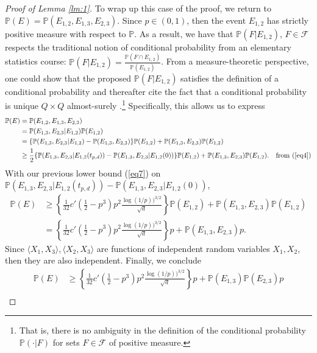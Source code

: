 \documentclass{article}
\begin{document}
\begin{proof}[Proof of Lemma \ref{lm:1}]
To wrap up this case of the proof, we return to $\mathbb{P}(E) = \mathbb{P}(E_{1,2}, E_{1,3}, E_{2,3}).$ Since $p \in (0, 1)$, then the event $E_{1,2}$ has strictly positive measure with respect to $\mathbb{P}$. As a result, we have that $\mathbb{P}( F | E_{1,2})$, $F \in \mathcal{F}$ respects the traditional notion of conditional probability from an elementary statistics course: $\mathbb{P}( F | E_{1,2}) = \frac{\mathbb{P}(F \cap E_{1,2}) }{\mathbb{P}(E_{1,2})}$. From a measure-theoretic perspective, one could show that the proposed $\mathbb{P}( F | E_{1,2})$ satisfies the definition of a conditional probability and thereafter cite the fact that a conditional probability is unique $Q \times Q$ almost-surely \cite{pollard_2001}.\footnote{That is, there is no ambiguity in the definition of the conditional probability $\mathbb{P}( \cdot | F)$ for sets $F \in \mathcal{F}$ of positive measure.} Specifically, this allows us to express
\begin{align*}
    \mathbb{P}(E) &= \mathbb{P}(E_{1,2}, E_{1,3}, E_{2,3})\\
               &= \mathbb{P}(E_{1,3}, E_{2,3} | E_{1,2}) \mathbb{P}(E_{1,2})\\
               &= \{ \mathbb{P}(E_{1,3}, E_{2,3} | E_{1,2}) - \mathbb{P}(E_{1,3}, E_{2,3}) \}\mathbb{P}(E_{1,2}) + \mathbb{P}(E_{1,3}, E_{2,3})\mathbb{P}(E_{1,2})\\
               &\geq \frac{1}{2}\{ \mathbb{P}(E_{1,3}, E_{2,3} | E_{1,2}(t_{p,d})) - \mathbb{P}(E_{1,3},E_{2,3}| E_{1,2}(0)) \}\mathbb{P}(E_{1,2}) + \mathbb{P}(E_{1,3}, E_{2,3})\mathbb{P}(E_{1,2}). &\text{from (\ref{eq4})}
\end{align*}
With our previous lower bound (\ref{eq7}) on $\mathbb{P}(E_{1,3}, E_{2,3} | E_{1,2}(t_{p,d})) - \mathbb{P}(E_{1,3},E_{2,3}| E_{1,2}(0))$,
\begin{align*}
    \mathbb{P}(E) &\geq  \left\{ \frac{1}{32} c'\left( \frac{1}{2} - p^3 \right)p^2 \frac{\log(1/p))^{3/2}}{\sqrt{d}} \right\}\mathbb{P}(E_{1,2}) + \mathbb{P}(E_{1,3}, E_{2,3})\mathbb{P}(E_{1,2})\\
    &= \left\{ \frac{1}{32} c'\left( \frac{1}{2} - p^3 \right)p^2 \frac{\log(1/p))^{3/2}}{\sqrt{d}} \right\}p + \mathbb{P}(E_{1,3}, E_{2,3})p.
\end{align*}
Since $\langle X_1, X_3 \rangle, \langle X_2, X_3 \rangle$ are functions of independent random variables $X_1, X_2$, then they are also independent. Finally, we conclude
\begin{align}
\mathbb{P}(E) &\geq \left\{ \frac{1}{32} c'\left( \frac{1}{2} - p^3 \right)p^2 \frac{\log(1/p))^{3/2}}{\sqrt{d}} \right\}p + \mathbb{P}(E_{1,3})\mathbb{P}(E_{2,3})p \nonumber\\

\end{align}
\end{proof}
\end{document}
